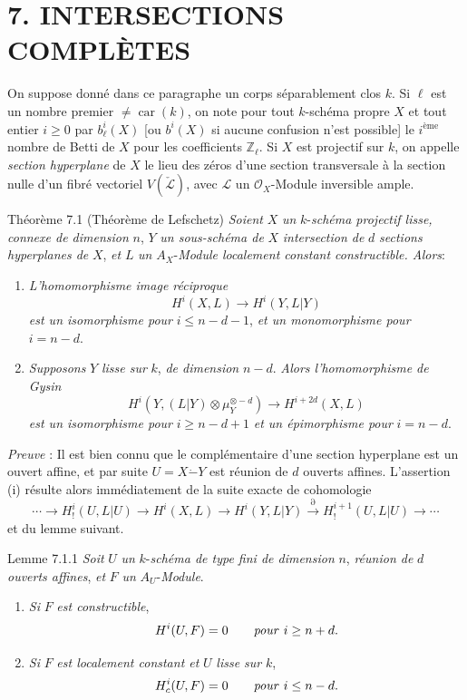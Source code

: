 \section*{7. INTERSECTIONS COMPLÈTES}

On suppose donné dans ce paragraphe un corps séparablement clos $k$. Si $\ell$ est un nombre premier $\ne\operatorname{car}(k)$, on note pour tout $k$-schéma propre $X$ et tout entier $i\ge0$ par
$b_\ell^i(X)$ [ou $b^i(X)$ si aucune confusion n'est possible] le $i^{\text{ème}}$ nombre de Betti de $X$ pour les coefficients $\mathbb{Z}_\ell$. Si $X$ est projectif sur $k$, on appelle \emph{section hyperplane} de $X$ le lieu des zéros d'une section transversale à la section nulle d'un fibré vectoriel $V(\check{\mathcal{L}})$, avec $\mathcal{L}$ un $\mathcal{O}_X$-Module inversible ample.

\begin{statement}{Théorème 7.1}
(Théorème de Lefschetz) \emph{Soient} $X$ \emph{un} $k$-\emph{schéma projectif lisse, connexe de dimension} $n$, $Y$ \emph{un sous-schéma de} $X$ \emph{intersection de} $d$ \emph{sections hyperplanes de} $X$, \emph{et} $L$ \emph{un} $A_X$-\emph{Module localement constant constructible. Alors}:
\begin{enumerate}[label=(\roman*)]
\item \emph{L'homomorphisme image réciproque}
\[
H^i(X,L)\to H^i(Y,L|Y)
\]
\emph{est un isomorphisme pour} $i\le n-d-1$, \emph{et un monomorphisme pour} $i=n-d$.
\item \emph{Supposons} $Y$ \emph{lisse sur} $k$, \emph{de dimension} $n-d$. \emph{Alors l'homomorphisme de Gysin}
\[
H^i(Y,(L|Y)\otimes\mu_Y^{\otimes -d})\to H^{i+2d}(X,L)
\]
\emph{est un isomorphisme pour} $i\ge n-d+1$ \emph{et un épimorphisme pour} $i=n-d$.
\end{enumerate}
\end{statement}

\emph{Preuve} : Il est bien connu que le complémentaire d'une section hyperplane est un ouvert affine, et par suite $U=X\mathbin{\dot{-}}Y$ est réunion de $d$ ouverts affines. L'assertion (i) résulte alors immédiatement de la suite exacte de cohomologie
\[
\cdots\to H_!^i(U,L|U)\to H^i(X,L)\to H^i(Y,L|Y)
\xrightarrow{\partial} H_!^{i+1}(U,L|U)\to\cdots
\]
et du lemme suivant.

\begin{statement}{Lemme 7.1.1}
\emph{Soit} $U$ \emph{un} $k$-\emph{schéma de type fini de dimension} $n$, \emph{réunion de} $d$ \emph{ouverts affines}, \emph{et} $F$ \emph{un} $A_U$-\emph{Module}.
\begin{enumerate}[label=\alph*)]
\item \emph{Si} $F$ \emph{est constructible},
\[
H^i(U,F)=0\qquad\text{\emph{pour} }i\ge n+d.
\]
\item \emph{Si} $F$ \emph{est localement constant et} $U$ \emph{lisse sur} $k$,
\[
H^i_c(U,F)=0\qquad\text{\emph{pour} }i\le n-d.
\]
\end{enumerate}
\end{statement}

